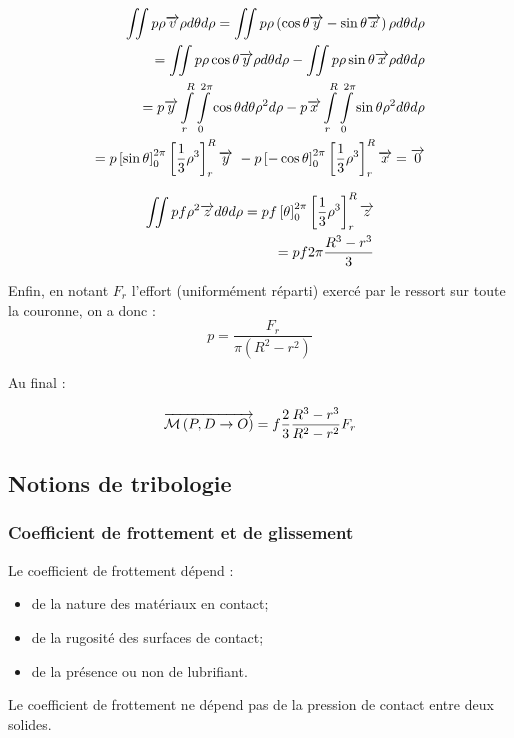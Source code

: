 \documentclass[11pt,oneside]{article}
\begin{document}
\begin{exemple}
\begin{eqnarray*}
\iint p\rho\overrightarrow{v} \rho d\theta d\rho = \iint p\rho\left(\cos\theta\overrightarrow{y}-\sin\theta\overrightarrow{x} \right) \rho d\theta d\rho \\
=\iint p\rho\cos\theta\overrightarrow{y}  \rho d\theta d\rho-\iint p\rho \sin\theta\overrightarrow{x}  \rho d\theta d\rho \\
=p \overrightarrow{y}  \int\limits_{r}^{R} \int\limits_{0}^{2\pi}\cos\theta d\theta \rho^2 d\rho- p\overrightarrow{x}\int\limits_{r}^{R} \int\limits_{0}^{2\pi} \sin\theta  \rho^2 d\theta d\rho \\
=p \left[ \sin\theta\right]_{0}^{2\pi}\left[ \dfrac{1}{3}\rho^3\right]_{r}^{R}\overrightarrow{y}\
 -
p \left[ -\cos\theta\right]_{0}^{2\pi}\left[ \dfrac{1}{3}\rho^3\right]_{r}^{R}\overrightarrow{x} = \overrightarrow{0}
\end{eqnarray*}

\begin{eqnarray*}
\iint pf\rho^2 \overrightarrow{z} d\theta d\rho =
pf \left[ \theta\right]_{0}^{2\pi}\left[ \dfrac{1}{3}\rho^3\right]_{r}^{R} \overrightarrow{z}\\
= pf2\pi \dfrac{R^3-r^3}{3} 
\end{eqnarray*} 

Enfin, en notant $F_r$ l'effort (uniformément réparti) exercé par le ressort sur toute la couronne, on a donc :
$$
p=\dfrac{F_r}{\pi \left(R^2-r^2 \right)}
$$

Au final : 

$$ \overrightarrow{\mathcal{M}\left( {P}, {D} \rightarrow {O}\right)}  
= f\dfrac{2}{3} \dfrac{R^3-r^3}{R^2-r^2} F_r
$$
\end{exemple}
\subsection{Notions de tribologie}

\subsubsection{Coefficient de frottement et de glissement}
Le coefficient de frottement dépend : 
\begin{itemize}
\item de la nature des matériaux en contact; 
\item de la rugosité des surfaces de contact; 
\item de la présence ou non de lubrifiant.
\end{itemize}

Le coefficient de frottement ne dépend pas de la pression de contact entre deux solides.
\end{document}
